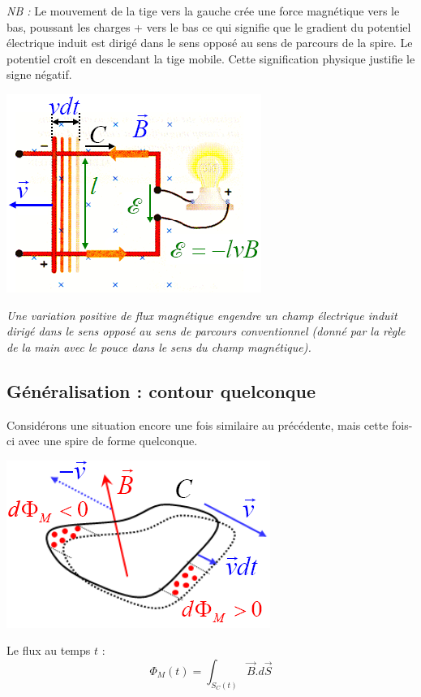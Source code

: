 \documentclass	[11pt, a4paper, openany]{book}
\begin{document}
\textit{NB :} Le mouvement de la tige vers la gauche crée une force magnétique vers le bas, poussant les charges + vers le bas ce qui signifie que le gradient du potentiel électrique induit est dirigé dans le sens opposé au sens de parcours de la spire. Le potentiel croît en descendant la tige mobile. Cette signification physique justifie le signe négatif. 
\begin{center}
\includegraphics[scale=0.45]{em/image11.png}\\
\end{center}
\textit{Une variation positive de flux magnétique engendre un champ électrique induit dirigé dans le sens opposé au sens de parcours conventionnel (donné par la règle de la main avec le pouce dans le sens du champ magnétique).}

\subsection{Généralisation : contour quelconque}
Considérons une situation encore une fois similaire au précédente, mais cette fois-ci avec une spire de forme quelconque.
\begin{center}
\includegraphics[scale=0.45]{em/image12.png}\\
\end{center}
Le flux au temps $t$ :
\begin{equation}
\Phi_M(t)= \int_{S_C(t)} \vec{B}.d\vec{S}
\end{equation}
\end{document}
